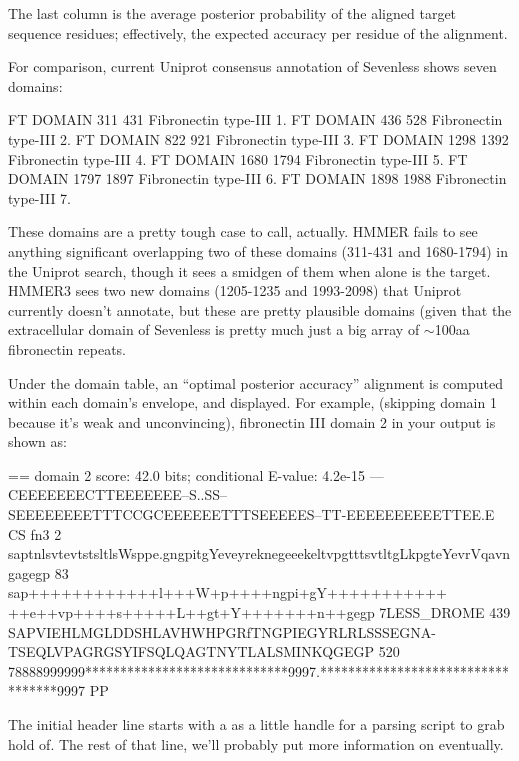 The last column is the average posterior probability of the aligned
target sequence residues; effectively, the expected accuracy per
residue of the alignment.

For comparison, current Uniprot consensus annotation of Sevenless
shows seven domains:

\begin{sreoutput}
FT   DOMAIN      311    431       Fibronectin type-III 1.
FT   DOMAIN      436    528       Fibronectin type-III 2.
FT   DOMAIN      822    921       Fibronectin type-III 3.
FT   DOMAIN     1298   1392       Fibronectin type-III 4.
FT   DOMAIN     1680   1794       Fibronectin type-III 5.
FT   DOMAIN     1797   1897       Fibronectin type-III 6.
FT   DOMAIN     1898   1988       Fibronectin type-III 7.
\end{sreoutput}

These domains are a pretty tough case to call, actually. HMMER fails
to see anything significant overlapping two of these domains (311-431
and 1680-1794) in the Uniprot search, though it sees a smidgen of them
when  alone is the target. HMMER3 sees two new
domains (1205-1235 and 1993-2098) that Uniprot currently doesn't
annotate, but these are pretty plausible domains (given that the
extracellular domain of Sevenless is pretty much just a big array of
$\sim$100aa fibronectin repeats.

Under the domain table, an ``optimal posterior accuracy'' alignment
\citep{Holmes98} is computed within each domain's envelope, and
displayed. For example, (skipping domain 1 because it's weak and
unconvincing), fibronectin III domain 2 in your 
output is shown as:

\begin{sreoutput}
  == domain 2    score: 42.0 bits;  conditional E-value: 4.2e-15
                  ---CEEEEEEECTTEEEEEEE--S..SS--SEEEEEEEETTTCCGCEEEEEETTTSEEEEES--TT-EEEEEEEEEETTEE.E CS
          fn3   2 saptnlsvtevtstsltlsWsppe.gngpitgYeveyreknegeeekeltvpgtttsvtltgLkpgteYevrVqavngagegp 83 
                  sap++++++++++++l+++W+p++++ngpi+gY+++++++++++ ++e++vp++++s+++++L++gt+Y+++++++n++gegp
  7LESS_DROME 439 SAPVIEHLMGLDDSHLAVHWHPGRfTNGPIEGYRLRLSSSEGNA-TSEQLVPAGRGSYIFSQLQAGTNYTLALSMINKQGEGP 520
                  78888999999*****************************9997.**********************************9997 PP
\end{sreoutput}

The initial header line starts with a \prog{==} as a little handle for
a parsing script to grab hold of. The rest of that line, we'll
probably put more information on eventually.

